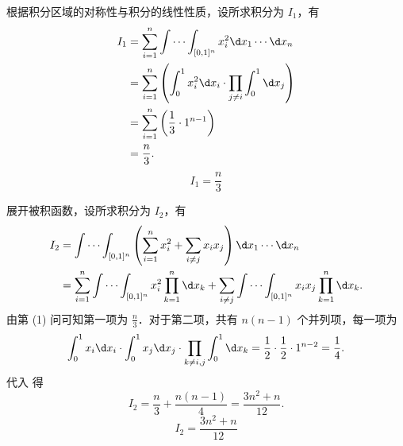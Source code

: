 \begin{solution}

    根据积分区域的对称性与积分的线性性质，设所求积分为 $I_1$，有
    \begin{equation}
        \begin{aligned}
            I_1 & = \sum_{i=1}^{n} \int \cdots \int_{[0,1]^n} x_i^2 \d x_1 \cdots \d x_n                       \\
                & = \sum_{i=1}^{n} \left( \int_0^1 x_i^2 \d x_i \cdot \prod_{j \neq i} \int_0^1 \d x_j \right) \\
                & = \sum_{i=1}^{n} \left( \frac{1}{3} \cdot 1^{n-1} \right)                                    \\
                & = \frac{n}{3}.
        \end{aligned}
    \end{equation}
    \begin{equation}
        \boxed{I_1 = \frac{n}{3}}
    \end{equation}


    展开被积函数，设所求积分为 $I_2$，有
    \begin{equation}
        \begin{aligned}
            I_2 & = \int \cdots \int_{[0,1]^n} \left( \sum_{i=1}^n x_i^2 + \sum_{i \neq j} x_i x_j \right) \d x_1 \cdots \d x_n                                   \\
                & = \sum_{i=1}^n \int \cdots \int_{[0,1]^n} x_i^2 \prod_{k=1}^n \d x_k + \sum_{i \neq j} \int \cdots \int_{[0,1]^n} x_i x_j \prod_{k=1}^n \d x_k.
        \end{aligned} \label{eq:expansion-2}
    \end{equation}
    由第 (1) 问可知第一项为 $\frac{n}{3}$．对于第二项，共有 $n(n-1)$ 个并列项，每一项为
    \begin{equation}
        \int_0^1 x_i \d x_i \cdot \int_0^1 x_j \d x_j \cdot \prod_{k \neq i,j} \int_0^1 \d x_k = \frac{1}{2} \cdot \frac{1}{2} \cdot 1^{n-2} = \frac{1}{4}.
    \end{equation}
    代入  得
    \begin{equation}
        I_2 = \frac{n}{3} + \frac{n(n-1)}{4} = \frac{3n^2 + n}{12}.
    \end{equation}
    \begin{equation}
        \boxed{I_2 = \frac{3n^2 + n}{12}}
    \end{equation}


\end{solution}
